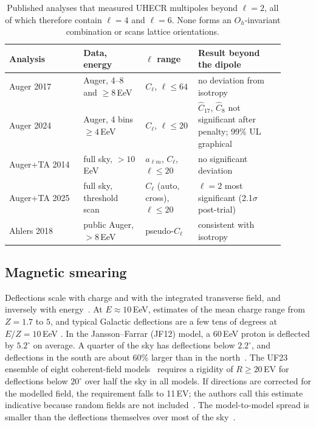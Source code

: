 \begin{table}[t]
\centering
\small
\caption{Published analyses that measured UHECR multipoles beyond $\ell=2$,
all of which therefore contain $\ell=4$ and $\ell=6$. None forms an
$O_h$-invariant combination or scans lattice orientations.}
\label{tab:uhecr:multipoles}
\begin{tabular}{p{0.24\linewidth}p{0.2\linewidth}p{0.17\linewidth}p{0.29\linewidth}}
\hline
Analysis & Data, energy & $\ell$ range & Result beyond the dipole\\
\hline
Auger 2017~\cite{PierreAuger2017multiresolution} & Auger, 4--8 and $\geq8$\,EeV & $C_\ell$, $\ell\le64$ & no deviation from isotropy\\
Auger 2024~\cite{PierreAuger2024large} & Auger, 4 bins $\geq4$\,EeV & $C_\ell$, $\ell\le20$ & $\hat C_{17}$, $\hat C_8$ not significant after penalty; 99\% UL graphical\\
Auger+TA 2014~\cite{PierreAugerTA2014searches} & full sky, $>10$\,EeV & $a_{\ell m}$, $C_\ell$, $\ell\le20$ & no significant deviation\\
Auger+TA 2025~\cite{PierreAugerTA2025new} & full sky, threshold scan & $C_\ell$ (auto, cross), $\ell\le20$ & $\ell=2$ most significant (2.1$\sigma$ post-trial)\\
Ahlers 2018~\cite{Ahlers2018searching} & public Auger, $>8$\,EeV & pseudo-$C_\ell$ & consistent with isotropy\\
\hline
\end{tabular}
\end{table}

\subsection{Magnetic smearing}
\label{sec:uhecr:gmf}

Deflections scale with charge and with the integrated transverse field, and
inversely with energy~\cite{PierreAuger2017observation}. At
$E\approx10$\,EeV, estimates of the mean charge range from $Z=1.7$ to $5$, and
typical Galactic deflections are a few tens of degrees at $E/Z=10$\,EeV
\cite{PierreAuger2017observation}. In the Jansson--Farrar (JF12) model, a
60\,EeV proton is deflected by $5.2^\circ$ on average. A quarter of the sky has
deflections below $2.2^\circ$, and deflections in the south are about 60\%
larger than in the north~\cite{Jansson2012new}. The UF23 ensemble of eight
coherent-field models~\cite{Unger2024coherent} requires a rigidity of
$R\geq20$\,EV for deflections below $20^\circ$ over half the sky in all models.
If directions are corrected for the modelled field, the requirement falls to
11\,EV; the authors call this estimate indicative because random fields are
not included~\cite{Unger2024coherent}. The model-to-model spread is smaller than
the deflections themselves over most of the sky~\cite{Unger2024coherent}.

